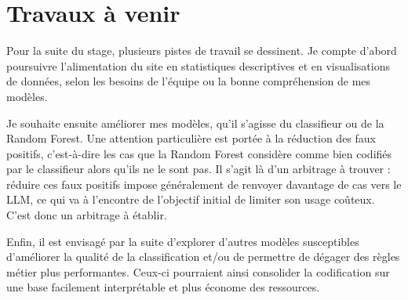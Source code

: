 \documentclass{rapportCS}
\begin{document}
\section{Travaux à venir}

Pour la suite du stage, plusieurs pistes de travail se dessinent. Je compte d'abord poursuivre l'alimentation du site en statistiques descriptives et en visualisations de données, selon les besoins de l'équipe ou la bonne compréhension de mes modèles. \newline

Je souhaite ensuite améliorer mes modèles, qu'il s'agisse du classifieur ou de la Random Forest. Une attention particulière est portée à la réduction des faux positifs, c'est-à-dire les cas que la Random Forest considère comme bien codifiés par le classifieur alors qu'ils ne le sont pas. Il s'agit là d'un arbitrage à trouver : réduire ces faux positifs impose généralement de renvoyer davantage de cas vers le LLM, ce qui va à l'encontre de l'objectif initial de limiter son usage coûteux. C'est donc un arbitrage à établir. \newline

Enfin, il est envisagé par la suite d'explorer d'autres modèles susceptibles d'améliorer la qualité de la classification et/ou de permettre de dégager des règles métier plus performantes. Ceux-ci pourraient ainsi consolider la codification sur une base facilement interprétable et plus économe des ressources.
\end{document}
